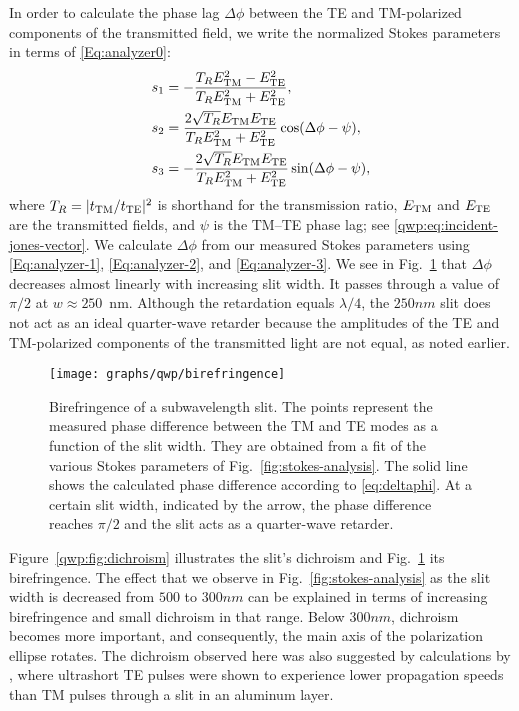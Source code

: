 In order to calculate the phase lag $\Delta\phi$ between the \gls{TE} and \gls{TM}-pol\-ar\-ized components of the transmitted field, we write the normalized Stokes parameters in terms of \eqref{Eq:analyzer0}:
\begin{align}
	s_1 &= -\frac{T_R E_{\text{TM}}^2 - E_{\text{TE}}^2}{T_R E_{\text{TM}}^2 + E_{\text{TE}}^2},
		\label{Eq:analyzer-1} \\
	s_2 &= \frac{2 \sqrt{T_R} E_{\text{TM}} E_{\text{TE}}}{T_R E_{\text{TM}}^2 + E_{\text{TE}}^2} \cos(\Delta\phi - \psi),
		\label{Eq:analyzer-2} \\
	s_3 &= -\frac{2 \sqrt{T_R} E_{\text{TM}} E_{\text{TE}}}{T_R E_{\text{TM}}^2 + E_{\text{TE}}^2} \sin(\Delta\phi - \psi),
		\label{Eq:analyzer-3}
\end{align}
where $T_R = |t_{\text{TM}}/t_{\text{TE}}|^2$ is shorthand for the transmission ratio, $E_{\text{TM}}$ and $E_{\text{TE}}$ are the transmitted fields, and $\psi$ is the \gls{TM}--\gls{TE} phase lag; see \eqref{qwp:eq:incident-jones-vector}.
We calculate $\Delta\phi$ from our measured Stokes parameters using \eqref{Eq:analyzer-1}, \eqref{Eq:analyzer-2}, and \eqref{Eq:analyzer-3}.
We see in Fig.~\ref{qwp:fig:birefringence} that $\Delta\phi$ decreases almost linearly with increasing slit width.
It passes through a value of $\pi/2$ at $w \approx 250$~nm.
Although the retardation equals $\lambda/4$, the $250\unit{nm}$ slit does not act as an ideal quarter-wave retarder because the amplitudes of the \gls{TE} and \gls{TM}-polarized components of the transmitted light are not equal, as noted earlier.
%
\begin{figure}[tb]
\forceversofloat\centering
\texttt{[image: graphs/qwp/birefringence]}
\caption{Birefringence of a subwavelength slit. The points represent the measured phase difference between the \gls{TM} and \gls{TE} modes as a function of the slit width. They are obtained from a fit of the various Stokes parameters of Fig.~\ref{fig:stokes-analysis}. The solid line shows the calculated phase difference according to \eqref{eq:deltaphi}. At a certain slit width, indicated by the arrow, the phase difference reaches $π/2$ and the slit acts as a quarter-wave retarder.
}
\label{qwp:fig:birefringence}
\end{figure}

Figure~\ref{qwp:fig:dichroism} illustrates the slit's dichroism and Fig.~\ref{qwp:fig:birefringence} its birefringence.
The effect that we observe in Fig.~\ref{fig:stokes-analysis} as the slit width is decreased from $500$ to $300\unit{nm}$ can be explained in terms of increasing birefringence and small dichroism in that range.
Below $300\unit{nm}$, dichroism becomes more important, and consequently, the main axis of the polarization ellipse rotates.
The dichroism observed here was also suggested by calculations by \citeauthor{Nugrowati2008}\cite{Nugrowati2008}, where ultrashort \gls{TE} pulses were shown to experience lower propagation speeds than \gls{TM} pulses through a slit in an aluminum layer.

